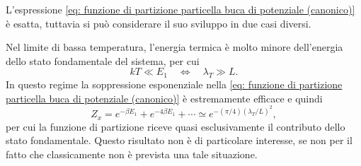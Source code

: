 L'espressione \eqref{eq: funzione di partizione particella buca di potenziale (canonico)} è esatta, tuttavia si può considerare il suo sviluppo in due casi diversi.
\setcounter{caso}{0}
\begin{caso}
    Nel limite di bassa temperatura, l'energia termica è molto minore dell'energia dello stato fondamentale del sistema, per cui
    \begin{equation}
        kT \ll E_1 \quad\Longleftrightarrow\quad \lambda_T \gg L.
    \end{equation}
    In questo regime la soppressione esponenziale nella \eqref{eq: funzione di partizione particella buca di potenziale (canonico)} è estremamente efficace e quindi
    \begin{equation}
    \label{eq: sviluppo bassa T funzione di partizione particella buca di potenziale (canonico)}
        Z_x = e^{-\beta E_1} + e^{-4\beta E_1} + \cdots \simeq e^{-(\pi/4)(\lambda_T/L)^2},
    \end{equation}
    per cui la funzione di partizione riceve quasi esclusivamente il contributo dello stato fondamentale. Questo risultato non è di particolare interesse, se non per il fatto che classicamente non è prevista una tale situazione.
\end{caso}

